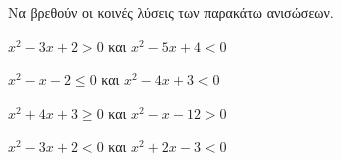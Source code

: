 Να βρεθούν οι κοινές λύσεις των παρακάτω ανισώσεων.
\begin{multicols}{2}
\begin{alist}
\item $ x^2-3x+2>0 $ και $ x^2-5x+4<0 $
\item $ x^2-x-2\leq0 $ και $ x^2-4x+3<0 $
\item $ x^2+4x+3\geq 0 $ και $ x^2-x-12>0 $
\item $ x^2-3x+2<0 $ και $ x^2+2x-3<0 $
\end{alist}
\end{multicols}
